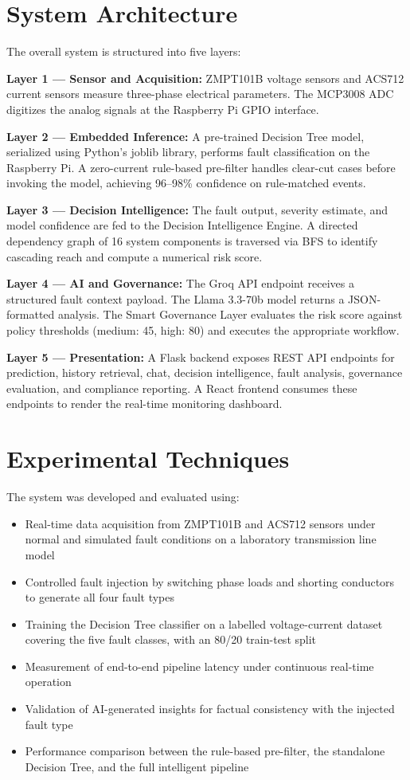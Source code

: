 \section{System Architecture}

The overall system is structured into five layers:

\textbf{Layer 1 — Sensor and Acquisition:} ZMPT101B voltage sensors and ACS712 current sensors measure three-phase electrical parameters. The MCP3008 ADC digitizes the analog signals at the Raspberry Pi GPIO interface.

\textbf{Layer 2 — Embedded Inference:} A pre-trained Decision Tree model, serialized using Python's joblib library, performs fault classification on the Raspberry Pi. A zero-current rule-based pre-filter handles clear-cut cases before invoking the model, achieving 96--98\% confidence on rule-matched events.

\textbf{Layer 3 — Decision Intelligence:} The fault output, severity estimate, and model confidence are fed to the Decision Intelligence Engine. A directed dependency graph of 16 system components is traversed via BFS to identify cascading reach and compute a numerical risk score.

\textbf{Layer 4 — AI and Governance:} The Groq API endpoint receives a structured fault context payload. The Llama 3.3-70b model returns a JSON-formatted analysis. The Smart Governance Layer evaluates the risk score against policy thresholds (medium: 45, high: 80) and executes the appropriate workflow.

\textbf{Layer 5 — Presentation:} A Flask backend exposes REST API endpoints for prediction, history retrieval, chat, decision intelligence, fault analysis, governance evaluation, and compliance reporting. A React frontend consumes these endpoints to render the real-time monitoring dashboard.

\section{Experimental Techniques}

The system was developed and evaluated using:
\begin{itemize}
\item Real-time data acquisition from ZMPT101B and ACS712 sensors under normal and simulated fault conditions on a laboratory transmission line model
\item Controlled fault injection by switching phase loads and shorting conductors to generate all four fault types
\item Training the Decision Tree classifier on a labelled voltage-current dataset covering the five fault classes, with an 80/20 train-test split
\item Measurement of end-to-end pipeline latency under continuous real-time operation
\item Validation of AI-generated insights for factual consistency with the injected fault type
\item Performance comparison between the rule-based pre-filter, the standalone Decision Tree, and the full intelligent pipeline
\end{itemize}


